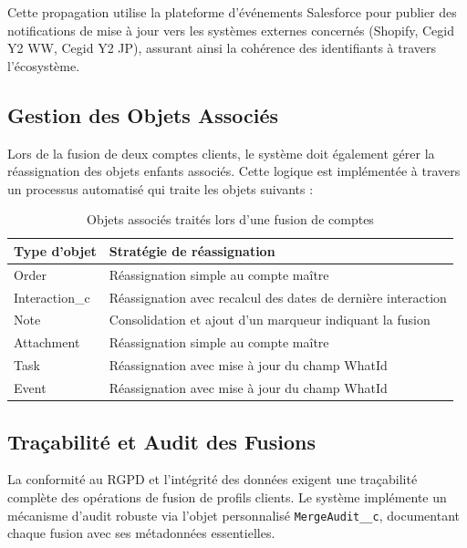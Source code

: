 Cette propagation utilise la plateforme d'événements Salesforce pour publier des notifications de mise à jour vers les systèmes externes concernés (Shopify, Cegid Y2 WW, Cegid Y2 JP), assurant ainsi la cohérence des identifiants à travers l'écosystème.

\newpage

\subsection{Gestion des Objets Associés}

Lors de la fusion de deux comptes clients, le système doit également gérer la réassignation des objets enfants associés. Cette logique est implémentée à travers un processus automatisé qui traite les objets suivants :

\begin{table}[H]
\centering
\caption{Objets associés traités lors d'une fusion de comptes}
\begin{tabular}{|p{6cm}|p{8.5cm}|}
\hline
\rowcolor{lightblue} \textbf{Type d'objet} & \textbf{Stratégie de réassignation} \\
\hline
Order & Réassignation simple au compte maître \\
\hline
Interaction\_c & Réassignation avec recalcul des dates de dernière interaction \\
\hline
Note & Consolidation et ajout d'un marqueur indiquant la fusion \\
\hline
Attachment & Réassignation simple au compte maître \\
\hline
Task & Réassignation avec mise à jour du champ WhatId \\
\hline
Event & Réassignation avec mise à jour du champ WhatId \\
\hline
\end{tabular}
\end{table}

\subsection{Traçabilité et Audit des Fusions}

\begin{mdframed}[style=breakablegreen]
La conformité au RGPD et l'intégrité des données exigent une traçabilité complète des opérations de fusion de profils clients. Le système implémente un mécanisme d'audit robuste via l'objet personnalisé \texttt{MergeAudit\_\_c}, documentant chaque fusion avec ses métadonnées essentielles.
\end{mdframed}

